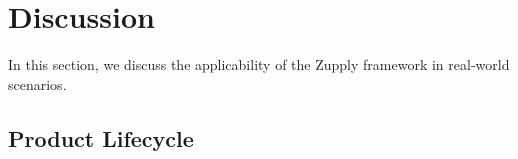 %
%
%
%
%
%
%
%
%
%
%
%
%


\section{Discussion}

In this section, we discuss the applicability of the Zupply framework in real-world scenarios.

\subsection{Product Lifecycle}

